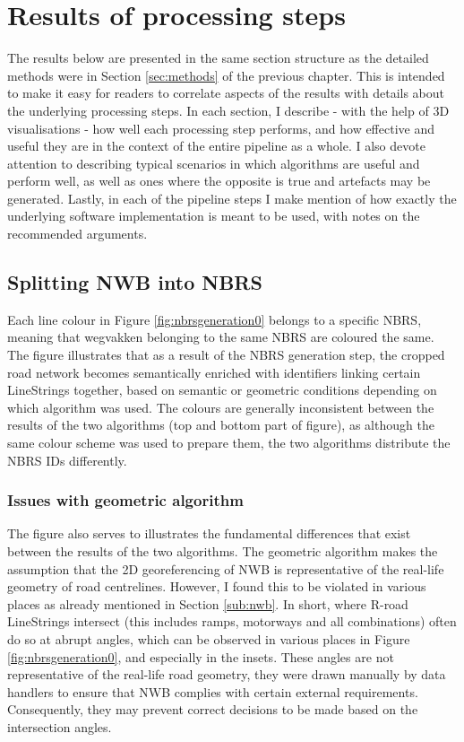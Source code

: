 \section{Results of processing steps}
\label{sec:results}

The results below are presented in the same section structure as the detailed methods were in Section \ref{sec:methods} of the previous chapter. This is intended to make it easy for readers to correlate aspects of the results with details about the underlying processing steps. In each section, I describe - with the help of 3D visualisations - how well each processing step performs, and how effective and useful they are in the context of the entire pipeline as a whole. I also devote attention to describing typical scenarios in which algorithms are useful and perform well, as well as ones where the opposite is true and artefacts may be generated. Lastly, in each of the pipeline steps I make mention of how exactly the underlying software implementation is meant to be used, with notes on the recommended arguments.

\subsection{Splitting NWB into NBRS}
\label{sub:r_nbrsgeneration}

Each line colour in Figure \ref{fig:nbrsgeneration0} belongs to a specific NBRS, meaning that wegvakken belonging to the same NBRS are coloured the same. The figure illustrates that as a result of the NBRS generation step, the cropped road network becomes semantically enriched with identifiers linking certain LineStrings together, based on semantic or geometric conditions depending on which algorithm was used. The colours are generally inconsistent between the results of the two algorithms (top and bottom part of figure), as although the same colour scheme was used to prepare them, the two algorithms distribute the NBRS IDs differently.

\subsubsection{Issues with geometric algorithm}

The figure also serves to illustrates the fundamental differences that exist between the results of the two algorithms. The geometric algorithm makes the assumption that the 2D georeferencing of NWB is representative of the real-life geometry of road centrelines. However, I found this to be violated in various places as already mentioned in Section \ref{sub:nwb}. In short, where R-road LineStrings intersect (this includes ramps, motorways and all combinations) often do so at abrupt angles, which can be observed in various places in Figure \ref{fig:nbrsgeneration0}, and especially in the insets. These angles are not representative of the real-life road geometry, they were drawn manually by data handlers to ensure that NWB complies with certain external requirements. Consequently, they may prevent correct decisions to be made based on the intersection angles.

